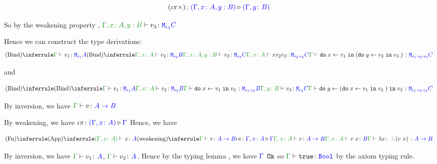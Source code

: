 \documentclass{report}
\begin{document}
   
    
    $$(\iota\pi\times) \colon {\color{blue}(\Gamma, x\colon A, y: B)} \triangleright {\color {blue} (\Gamma, y\colon B)}$$

    So by the weakening property , $\typerelation{\gax, y: B}{v_3}{\M{\e_3}{C}}$

    Hence we can construct the type derivations:
    \begin{equation} 
        \ntreeruleII{Bind}{
            \gtyperelation{v_1}{\M{\e_1}{A}}
        }{
            \ntreeruleII{Bind}{
                \typerelation{\gax}{v_2}{\M{\e_2}{B}}
            }{
                \typerelation{\gax, y: B}{v_3}{\M{\e_3}{C}}
            }{
                \typerelation{\gax}{\do{x}{v_2}{v_3}}{\M{\e_2 \dot \e_3}{C}}
            }
        }{
            \gtyperelation{
                \doin{x}{v_1}{
                    (\doin{y}{v_2}{v_3})
                }
            }{
                \M{\e_1\dot\e_2\dot\e_3}{C}
            }
        }
    \end{equation}

    and 

    \begin{equation}
        \ntreeruleII{Bind}{
            \ntreeruleII{Bind}{
                \gtyperelation{v_1}{\M{\e_1}{A}}
            }{
                \typerelation{\gax}{v_2}{\M{\e_2}{B}}
            } {
                \gtyperelation{\doin{x}{v_1}{v_2}}{\M{\e_1\dot\e_2}{B}}
            }
        }{
            \typerelation{\gby}{v_3}{\M{\e_3}{C}}
        }{
            \gtyperelation{\doin{y}{(\doin{x}{v_1}{v_2})}{v_3}}{\M{\e_1\dot\e_2\dot\e_3}{C}}
        }
    \end{equation}

    By inversion, we have $\gtyperelation{v}{\ab}$

    By weakening, we have $\iota\pi \colon {\color{blue}(\Gamma, x\colon A)} \triangleright {\color {blue} \Gamma}$
    Hence, we have

    \begin{equation}
        \ntreeruleI{Fn}{
            \ntreeruleII{App}{
                \typerelation{(\gax)}{x}{A}
            }{
                \ntreeruleII{weakening}{
                    \gtyperelation{v}{\ab}
                }{
                    \wrel{\i\pi}{\gax}{\G}
                }{
                    \typerelation{\gax}{v}{\ab}
                }
            } {
                \typerelation{\gax}{\apply{v}{x}}{B}
            }
        }{\gtyperelation{\lam{x}{A}{(\apply{v}{x})}}{\ab}}
    \end{equation}

        By inversion, we have $\gtyperelation{v_1}{ A}$, $\gtyperelation{v_2}{ A}$. Hence by the typing lemma , we have ${\color{blue} \Gamma} \texttt{ Ok}$ so $\gtyperelation{\t}{\B}$ by the axiom typing rule.
\end{document}
